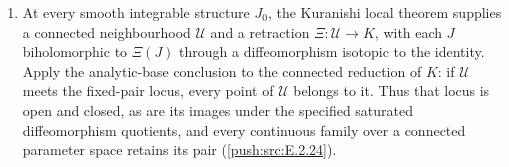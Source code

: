 \begin{enumerate}[label=\arabic*.,leftmargin=*]
finite deformation chain; conversely the admissible half-plane
and its quotient by the actual period lattice $2kl\Z$ give a
connected family for each fixed pair
(\ref{push:src:E.2.23}).
\item At every smooth integrable structure $J_0$, the Kuranishi
local theorem supplies a connected neighbourhood $\mathcal U$
and a retraction $\Xi:\mathcal U\to K$, with each $J$
biholomorphic to $\Xi(J)$ through a diffeomorphism isotopic to
the identity.  Apply the analytic-base conclusion to the
connected reduction of $K$: if $\mathcal U$ meets the fixed-pair
locus, every point of $\mathcal U$ belongs to it.  Thus that locus
is open and closed, as are its images under the specified
saturated diffeomorphism quotients, and every continuous family
over a connected parameter space retains its pair
(\ref{push:src:E.2.24}).
\end{enumerate}

